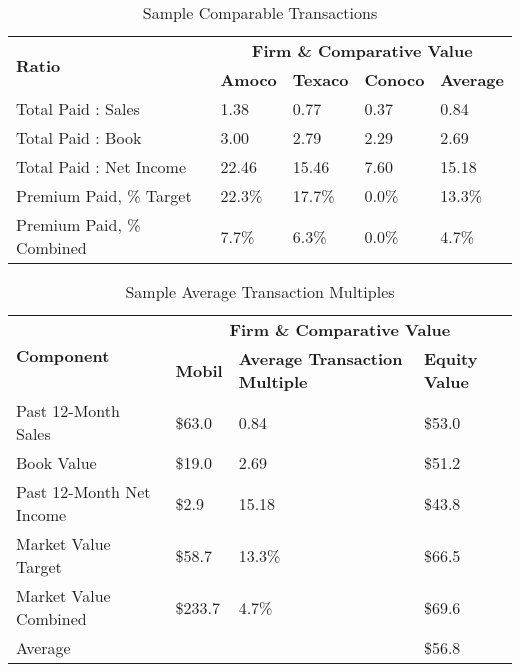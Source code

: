 \documentclass[11pt, english]{article}
\begin{document}
	\begin{table}[h]
                \scriptsize
                \renewcommand{\arraystretch}{1.25}
        \begin{center}
        \begin{tabular}{p{4cm}|p{2cm}p{2cm}p{2cm}|p{2cm}}
                \multirow{2}{*}{\textbf{Ratio}} & \multicolumn{4}{c}{\textbf{Firm \& Comparative Value}}\\
                \cline{2-5}
                & \textbf{Amoco} & \textbf{Texaco} & \textbf{Conoco} & \textbf{Average}\\
                \hline
                Total Paid : Sales & 1.38 & 0.77 & 0.37 & 0.84\\
                Total Paid : Book & 3.00 & 2.79 & 2.29 & 2.69\\
                Total Paid : Net Income & 22.46 & 15.46 & 7.60 & 15.18\\
                Premium Paid, \% Target & 22.3\% & 17.7\% & 0.0\% & 13.3\%\\
                Premium Paid, \% Combined & 7.7\% & 6.3\% & 0.0\% & 4.7\%\\
                \hline
        \end{tabular}
                \caption{Sample Comparable Transactions}
        \end{center}
        \end{table}

        \begin{table}[h]
                \scriptsize
                \renewcommand{\arraystretch}{1.25}
        \begin{center}
        \begin{tabular}{p{3.5cm}|p{2cm}p{4.5cm}|p{2cm}}
                \multirow{2}{*}{\textbf{Component}} & \multicolumn{3}{c}{\textbf{Firm \& Comparative Value}}\\
                \cline{2-4}
                & \textbf{Mobil} & \textbf{Average Transaction Multiple} & \textbf{Equity Value}\\
                \hline
                Past 12-Month Sales & \$63.0 & 0.84 & \$53.0\\
                Book Value & \$19.0 & 2.69 & \$51.2\\
                Past 12-Month Net Income & \$2.9 & 15.18 & \$43.8\\
                Market Value Target & \$58.7 & 13.3\% & \$66.5\\
                Market Value Combined & \$233.7 & 4.7\% & \$69.6\\
                \cline{4-4}
                Average & \multicolumn{2}{c|}{} & \$56.8\\
                \hline
        \end{tabular}
                \caption{Sample Average Transaction Multiples}
        \end{center}
        \end{table}
\end{document}
